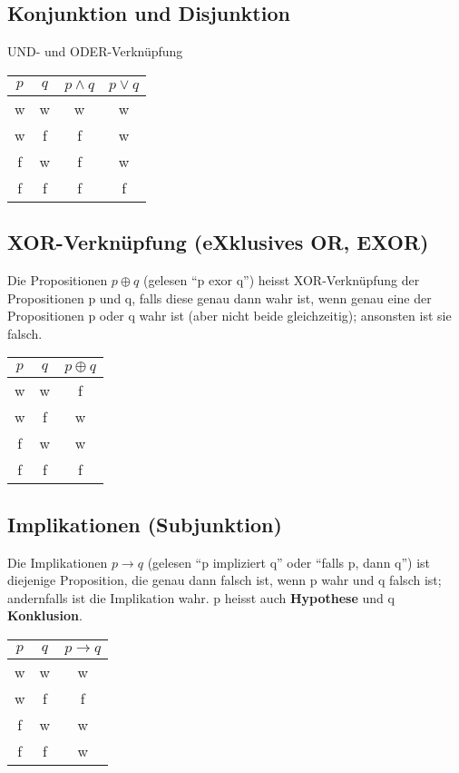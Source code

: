 \documentclass[10pt,a4paper]{article}
\begin{document}
\subsection{Konjunktion und Disjunktion}UND- und ODER-Verknüpfung\\
\begin{tabular}{|c|c|c|c|}
    \hline
        $p$&$q$&$p\wedge q$&$p\vee q$\\
        \hline
        w&w&w&w\\
        w&f&f&w\\
        f&w&f&w\\
        f&f&f&f\\
    \hline
\end{tabular}

\subsection{XOR-Verknüpfung (eXklusives OR, EXOR)}Die Propositionen $p \oplus q$ (gelesen "`p exor q"') heisst XOR-Verknüpfung der Propositionen p und q, falls diese genau dann wahr ist, wenn genau eine der Propositionen p oder q wahr ist (aber nicht beide gleichzeitig); ansonsten ist sie falsch.\\
\begin{tabular}{|c|c|c|}
    \hline
        $p$&$q$&$p\oplus q$\\
        \hline
        w&w&f\\
        w&f&w\\
        f&w&w\\
        f&f&f\\
    \hline
\end{tabular}

\subsection{Implikationen (Subjunktion)}Die Implikationen $p \rightarrow q$ (gelesen "`p impliziert q"' oder "`falls p, dann q"') ist diejenige Proposition, die genau dann falsch ist, wenn p wahr und q falsch ist; andernfalls ist die Implikation wahr. p heisst auch \textbf{Hypothese} und q \textbf{Konklusion}.\\
\begin{tabular}{|c|c|c|}
    \hline
        $p$&$q$&$p\rightarrow q$\\
        \hline
        w&w&w\\
        w&f&f\\
        f&w&w\\
        f&f&w\\
    \hline
\end{tabular}
\end{document}
